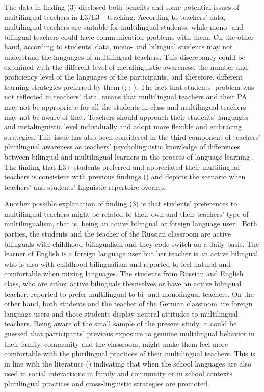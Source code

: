 \documentclass[output=paper]{../langscibook}
\begin{document}
The data in finding (3) disclosed both benefits and some potential issues of multilingual teachers in L3/L3+ teaching. According to teachers’ data, multilingual teachers are suitable for multilingual students, while mono- and bilingual teachers could have communication problems with them. On the other hand, according to students’ data, mono- and bilingual students may not understand the languages of multilingual teachers. This discrepancy could be explained with the different level of metalinguistic awareness, the number and proficiency level of the languages of the participants, and therefore, different learning strategies preferred by them (\citealt{Cenoz2013b}; \citealt{JessnerEtAl2016}; \citealt{Dmitrenko2017}). The fact that students’ problem was not reflected in teachers’ data, means that multilingual teachers and their PA may not be appropriate for all the students in class and multilingual teachers may not be aware of that. Teachers should approach their students’ languages and metalinguistic level individually and adopt more flexible and embracing strategies. This issue has also been considered in the third component of teachers’ plurilingual awareness as teachers’ psycholinguistic knowledge of differences between bilingual and multilingual learners in the process of language learning \citep{Otwinowska2014}. The finding that L3+ students preferred and appreciated their multilingual teachers is consistent with previous findings (\citealt{AroninOLaoire2003}) and depicts the scenario when teachers’ and students’ linguistic repertoire overlap.

Another possible explanation of finding (3) is that students’ preferences to multilingual teachers might be related to their own and their teachers’ type of multilingualism, that is, being an active bilingual or foreign language user \citep[82]{Cenoz2013b}. Both parties, the students and the teacher of the Russian classroom are active bilinguals with childhood bilingualism and they code-switch on a daily basis. The learner of English is a foreign language user but her teacher is an active bilingual, who is also with childhood bilingualism and reported to feel natural and comfortable when mixing languages. The students from Russian and English class, who are either active bilinguals themselves or have an active bilingual teacher, reported to prefer multilingual to bi- and monolingual teachers. On the other hand, both students and the teacher of the German classroom are foreign language users and those students display neutral attitudes to multilingual teachers. Being aware of the small sample of the present study, it could be guessed that participants’ previous exposure to genuine multilingual behavior in their family, community and the classroom, might make them feel more comfortable with the plurilingual practices of their multilingual teachers. This is in line with the literature (\citealt{BonoStratilaki2009}) indicating that when the school languages are also used in social interactions in family and community or in school contexts plurilingual practices and cross-linguistic strategies are promoted.
\end{document}
